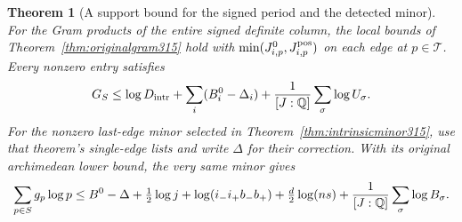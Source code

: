 \documentclass[a4paper,11pt]{article}
\newtheorem{theorem}[proposition]{Theorem}
\theoremstyle{definition}
\theoremstyle{remark}
\numberwithin{equation}{section}
\begin{document}
\begin{theorem}[A support bound for the signed period and the detected minor]\leavevmode
\label{thm:poscolumn316}
For the Gram products of the entire signed definite column, the
local bounds of Theorem~\ref{thm:originalgram315} hold with
\(\min(J^0_{i,p},J^{\rm pos}_{i,p})\) on each edge at
\(p\in\mathcal T\). Every nonzero entry satisfies
\[
 G_S\le\log D_{\rm intr}+\sum_i(B_i^0-\Delta_i)
                   +\frac{1}{[J:\mathbb Q]}\sum_\sigma\log U_\sigma .
\]
For the nonzero last-edge minor selected in
Theorem~\ref{thm:intrinsicminor315}, use that theorem's
single-edge lists and write \(\Delta\) for their correction.
With its original archimedean lower bound, the very same
minor gives
\[
 \sum_{p\in S}g_p\log p
 \le B^0-\Delta+\tfrac12\log j+\log(i_-i_+b_-b_+)
           +\tfrac d2\log(ns)+\frac{1}{[J:\mathbb Q]}\sum_\sigma\log B_\sigma .
\]
\end{theorem}
\end{document}
